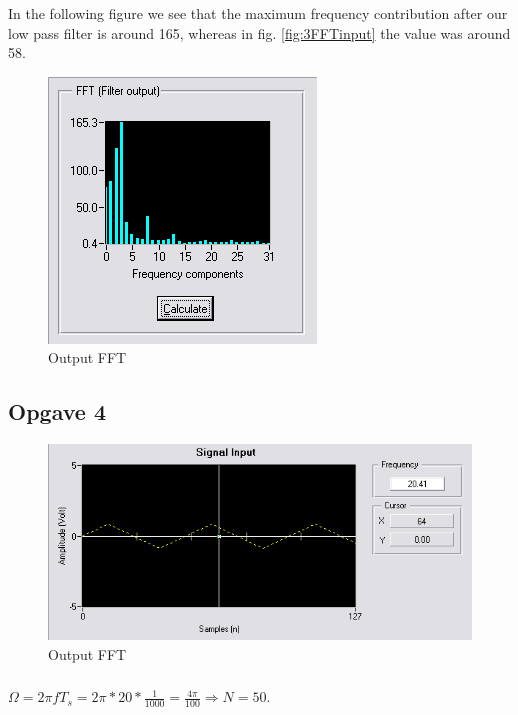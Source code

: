 \documentclass[a4paper, 12pt, titlepage]{article}
\begin{document}
\subsubsection{}
In the following figure we see that the maximum frequency contribution after our
low pass filter is around 165, whereas in fig. \ref{fig:3FFTinput} the value was
around 58. 
\begin{figure}[H]
\includegraphics[scale=0.7]{3FFToutput.png}
\caption{Output FFT}
\end{figure}
\subsection{Opgave 4}
\begin{figure}[H]
\includegraphics[scale=0.7]{4input.png}
\caption{Output FFT}
\end{figure}
\subsubsection{}
$ \Omega = 2 \pi f T_s = 2 \pi * 20 * \frac{1}{1000} = \frac{4\pi}{100}
\Rightarrow N = 50$.
\end{document}
